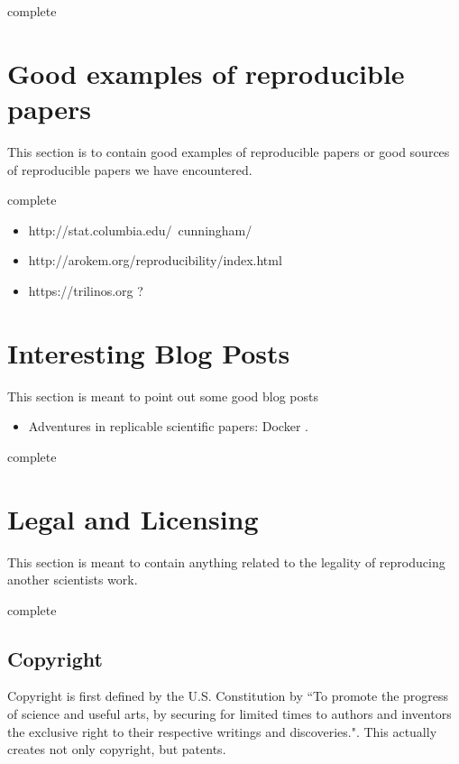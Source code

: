 \documentclass[american]{article}
\newcommand{\complete}{
	\gls{complete}
}
\begin{document}
\complete

\section{Good examples of reproducible papers} \label{sec:examples}

This section is to contain good examples of reproducible papers or good sources of reproducible papers we have encountered.

\complete

\begin{itemize}
\item http://stat.columbia.edu/~cunningham/
\item http://arokem.org/reproducibility/index.html
\item https://trilinos.org ?
\end{itemize}

\section{Interesting Blog Posts} \label{sec:blogposts}

This section is meant to point out some good blog posts

\begin{itemize}
\item Adventures in replicable scientific papers: Docker \cite{titus-brown-docker}.
\end{itemize}

\complete

\section{Legal and Licensing} \label{sec:legal}

This section is meant to contain anything related to the legality of reproducing another scientists work.

\complete

\subsection{Copyright} \label{sec:legal-copyright}

Copyright is first defined by the U.S. Constitution by \cite[art.~I, \S~8, cl.~8]{USConst} ``To promote the progress of science and useful arts, by securing for limited times to authors and inventors the exclusive right to their respective writings and discoveries.". This actually creates not only copyright, but patents.
\end{document}
